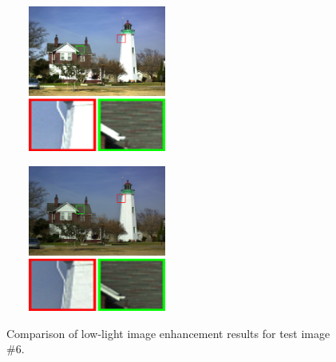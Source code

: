 \begin{figure}[htbp]
\begin{minipage}[b]{0.49\hsize}
		 \label{fig:qualitative/1/rrm}
	\end{minipage} \\
	\begin{minipage}[b]{0.49\hsize}
	\centering
	\includegraphics[width=60mm, height=48mm]{images/experiment/qualitative/comp1/lime.eps}
	 \label{fig:qualitative/1/lime}
	\end{minipage}
	\begin{minipage}[b]{0.49\hsize}
	\centering
	\includegraphics[width=60mm, height=48mm]{images/experiment/qualitative/comp1/prop.eps}
	 \label{fig:qualitative/1/prop}
	\end{minipage}
	\caption{Comparison of low-light image enhancement results for test image $\#6$.}
	\label{fig:qualitative/1}
\end{figure}
